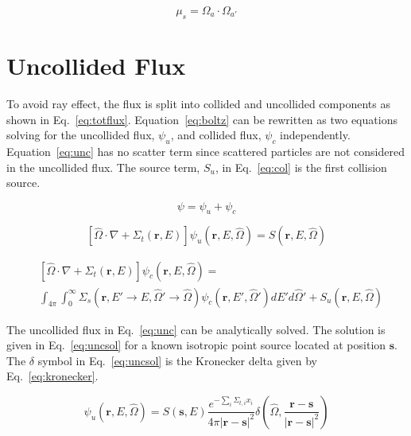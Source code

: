 \begin{equation} \label{eq:scat_cos}
\mu_s = \Omega_a \cdot \Omega_{a'}
\end{equation}

\section{Uncollided Flux}
To avoid ray effect, the flux is split into collided and uncollided components as shown in Eq.~\ref{eq:totflux}. Equation~\ref{eq:boltz} can be rewritten as two equations solving for the uncollided flux, $\psi_u$, and collided flux, $\psi_c$ independently. Equation~\ref{eq:unc} has no scatter term since scattered particles are not considered in the uncollided flux. The source term, $S_u$, in Eq.~\ref{eq:col} is the first collision source.

\begin{equation} \label{eq:totflux}
\psi = \psi_u + \psi_c
\end{equation}

\begin{equation} \label{eq:unc}
\left[ \hat{\Omega} \cdot \nabla + \Sigma_t(\boldsymbol{r}, E) \right]
\psi_u(\boldsymbol{r}, E, \hat{\Omega}) =  S(\boldsymbol{r}, E, \hat{\Omega})
\end{equation}

\begin{equation} \label{eq:col}
\begin{split}
	&\left[ \hat{\Omega} \cdot \nabla + \Sigma_t(\boldsymbol{r}, E) \right]
	\psi_c(\boldsymbol{r}, E, \hat{\Omega}) = \\
	&\int_{4 \pi} \int_0^\infty \Sigma_s(\boldsymbol{r}, E' \rightarrow E, \hat{\Omega}' \rightarrow \hat{\Omega}) \psi_c(\boldsymbol{r}, E', \hat{\Omega}') dE' d\hat{\Omega}' + S_{u}(\boldsymbol{r}, E, \hat{\Omega})
\end{split}
\end{equation}

The uncollided flux in Eq.~\ref{eq:unc} can be analytically solved. The solution is given in Eq.~\ref{eq:uncsol} for a known isotropic point source located at position $\boldsymbol{s}$. The $\delta$ symbol in Eq.~\ref{eq:uncsol} is the Kronecker delta given by Eq.~\ref{eq:kronecker}. 

\begin{equation} \label{eq:uncsol}
\psi_u(\boldsymbol{r}, E, \hat{\Omega}) = 
S(\boldsymbol{s}, E)
\frac{e^{-\sum_i \Sigma_{t,i} x_i}}{4\pi |\boldsymbol{r}-\boldsymbol{s}|^2}
\delta\left( \hat{\Omega}, \frac{\boldsymbol{r}-\boldsymbol{s}}{|\boldsymbol{r}-\boldsymbol{s}|^2}\right)
\end{equation}

